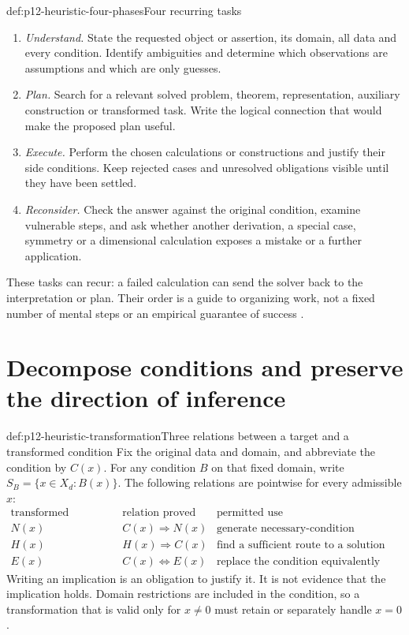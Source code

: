 \begin{hbmethod}{def:p12-heuristic-four-phases}{Four recurring tasks}
\begin{enumerate}
\item \emph{Understand.} State the requested object or assertion, its
domain, all data and every condition. Identify ambiguities and determine
which observations are assumptions and which are only guesses.
\item \emph{Plan.} Search for a relevant solved problem, theorem,
representation, auxiliary construction or transformed task. Write the
logical connection that would make the proposed plan useful.
\item \emph{Execute.} Perform the chosen calculations or constructions
and justify their side conditions. Keep rejected cases and unresolved
obligations visible until they have been settled.
\item \emph{Reconsider.} Check the answer against the original condition,
examine vulnerable steps, and ask whether another derivation, a special
case, symmetry or a dimensional calculation exposes a mistake or a
further application.
\end{enumerate}
These tasks can recur: a failed calculation can send the solver back
to the interpretation or plan. Their order is a guide to organizing
work, not a fixed number of mental steps or an empirical guarantee of
success \cite[Part~I, secs.~6--14]{Polya2004HowToSolveItSelected}.
\end{hbmethod}

\section{Decompose conditions and preserve the direction of inference}

\begin{hbdefinition}{def:p12-heuristic-transformation}{Three relations between a target and a transformed condition}
Fix the original data and domain, and abbreviate the condition by
\(C(x)\). For any condition \(B\) on that fixed domain, write
\(S_B=\{x\in X_d:B(x)\}\). The following relations are pointwise for every admissible
\(x\):
\[
\begin{array}{c|c|l}
\text{transformed condition}&\text{relation proved}&\text{permitted use}\\ \hline
N(x)&C(x)\Rightarrow N(x)&\text{generate necessary-condition candidates}\\
H(x)&H(x)\Rightarrow C(x)&\text{find a sufficient route to a solution}\\
E(x)&C(x)\Longleftrightarrow E(x)&\text{replace the condition equivalently}
\end{array}
\]
Writing an implication is an obligation to justify it. It is not
evidence that the implication holds. Domain restrictions are included
in the condition, so a transformation that is valid only for
\(x\ne0\) must retain or separately handle \(x=0\).
\end{hbdefinition}

